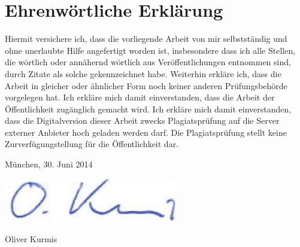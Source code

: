\newpage

\thispagestyle{empty}

\section*{Ehrenwörtliche Erklärung}  
 
Hiermit  versichere  ich, dass die vorliegende Arbeit von  mir  selbstständig  und 
ohne unerlaubte Hilfe angefertigt worden ist, insbesondere dass ich alle Stellen, 
die wörtlich oder annähernd wörtlich aus Veröffentlichungen entnommen sind, 
durch Zitate als solche gekennzeichnet habe.
Weiterhin erkläre ich, dass die Arbeit in gleicher oder ähnlicher Form noch keiner 
anderen  Prüfungsbehörde  vorgelegen  hat.  Ich  erkläre  mich  damit  einverstanden, 
dass  die  Arbeit  der  Öffentlichkeit  zugänglich  gemacht wird. 
Ich erkläre mich damit einverstanden, dass die Digitalversion dieser 
Arbeit zwecks Plagiatsprüfung auf die Server externer Anbieter hoch geladen 
werden  darf.  Die  Plagiatsprüfung  stellt  keine Zurverfügungstellung  für  die 
Öffentlichkeit dar.
 
München, 30. Juni 2014

\includegraphics[width=.2\textwidth]{img/unterschrift.png}

Oliver Kurmis
